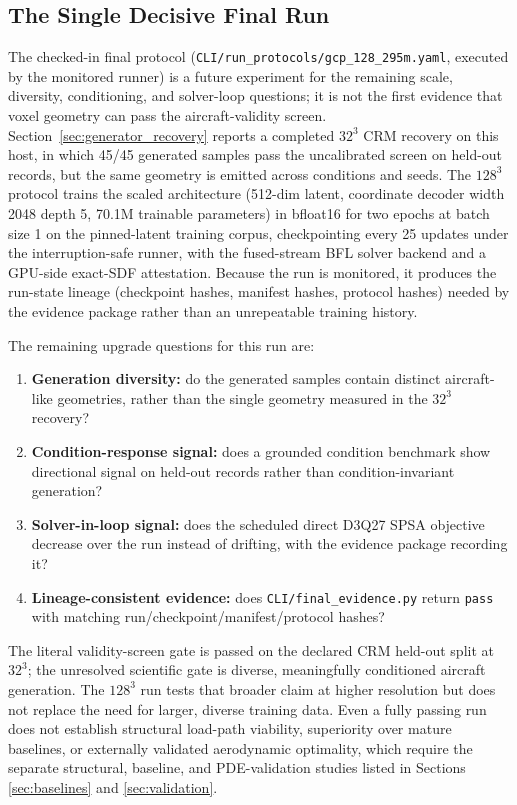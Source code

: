 \subsection{The Single Decisive Final Run}
\label{sec:final_run}
The checked-in final protocol (\texttt{CLI/run\_protocols/gcp\_128\_295m.yaml}, executed by the monitored runner) is a future experiment for the remaining scale, diversity, conditioning, and solver-loop questions; it is not the first evidence that voxel geometry can pass the aircraft-validity screen. Section~\ref{sec:generator_recovery} reports a completed \(32^3\) CRM recovery on this host, in which 45/45 generated samples pass the uncalibrated screen on held-out records, but the same geometry is emitted across conditions and seeds. The \(128^3\) protocol trains the scaled architecture (512-dim latent, coordinate decoder width 2048 depth 5, 70.1M trainable parameters) in bfloat16 for two epochs at batch size 1 on the pinned-latent training corpus, checkpointing every 25 updates under the interruption-safe runner, with the fused-stream BFL solver backend and a GPU-side exact-SDF attestation. Because the run is monitored, it produces the run-state lineage (checkpoint hashes, manifest hashes, protocol hashes) needed by the evidence package rather than an unrepeatable training history.

The remaining upgrade questions for this run are:
\begin{enumerate}
    \item \textbf{Generation diversity:} do the generated samples contain distinct aircraft-like geometries, rather than the single geometry measured in the \(32^3\) recovery?
    \item \textbf{Condition-response signal:} does a grounded condition benchmark show directional signal on held-out records rather than condition-invariant generation?
    \item \textbf{Solver-in-loop signal:} does the scheduled direct D3Q27 SPSA objective decrease over the run instead of drifting, with the evidence package recording it?
    \item \textbf{Lineage-consistent evidence:} does \texttt{CLI/final\_evidence.py} return \texttt{pass} with matching run/checkpoint/manifest/protocol hashes?
\end{enumerate}

The literal validity-screen gate is passed on the declared CRM held-out split at \(32^3\); the unresolved scientific gate is diverse, meaningfully conditioned aircraft generation. The \(128^3\) run tests that broader claim at higher resolution but does not replace the need for larger, diverse training data. Even a fully passing run does not establish structural load-path viability, superiority over mature baselines, or externally validated aerodynamic optimality, which require the separate structural, baseline, and PDE-validation studies listed in Sections \ref{sec:baselines} and \ref{sec:validation}.
\par
